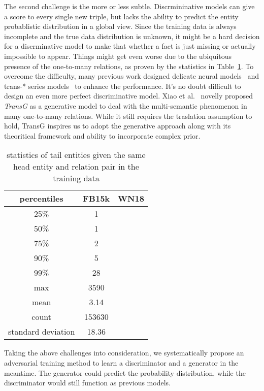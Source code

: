 \documentclass[twocolumn,a4paper,10pt,review,5p]{elsarticle}
\begin{document}

The second challenge is the more or less subtle. Discrmininative models can give a score to every single new triple, but lacks the ability to predict the entity probablistic distribution in a global view. Since the training data is always incomplete and the true data distribution is unknown, it might be a hard decision for a discrminative model to make that whether a fact is just missing or actually impossible to appear. Things might get even worse due to the ubiquitous presence of the one-to-many relations, as proven by the statistics in Table~\ref{one-to-many}. To overcome the difficulty, many previous work designed delicate neural models~\cite{NTN} and trans-* series models~\cite{TransH2014,TransR2015} to enhance the performance. It's no doubt difficult to design an even more perfect discriminative model. Xiao et al.~\cite{TransG} novelly proposed \emph{TransG} as a generative model to deal with the multi-semantic phenomenon in many one-to-many relations. While it still requires the traslation assumption to hold, TransG inspires us to adopt the generative approach along with its theoritical framework and ability to incorporate complex prior.

\begin{table}
    \centering
    \begin{tabular}{ccc}
        \toprule
        percentiles & FB15k & WN18 \\
        \midrule
        25\% &  1   &  \\
        50\% &  1   &  \\
        75\% &  2   &  \\
        90\% &  5   &  \\
        99\% &  28  &  \\
        max & 3590  &  \\
        \midrule
        mean &  3.14 & \\
        count & 153630 & \\
        standard deviation & 18.36 & \\
        \bottomrule
    \end{tabular}
    \caption{statistics of tail entities given the same head entity and relation pair in the training data}
\label{one-to-many}
\end{table}

Taking the above challenges into consideration, we systematically propose an adversarial training method to learn a discriminator and a generator in the meantime. The generator could predict the probability distribution, while the discriminator would still function as previous models.
\end{document}
